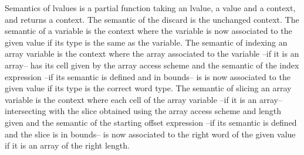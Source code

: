 \documentclass{article}
\begin{document}
\smallskip

Semantics of lvalues is a partial function taking an lvalue, a value
and a context, and returns a context.
The semantic of the discard is the unchanged context. The semantic of a variable
is the context where the variable is now associated to the given value if its
type is the same as the variable. The semantic of indexing an array variable is
the context where the array associated to the variable --if it is an array-- has
its cell given by the array access scheme and the semantic of the index
expression --if its semantic is defined and in bounds-- is is now associated to
the given value if its type is the correct word type. The semantic of slicing an
array variable is the context where each cell of the array variable --if it is
an array-- intersecting with the slice obtained using the array access scheme
and length given and the semantic of the starting offset expression --if its
semantic is defined and the slice is in bounds-- is now associated to the right
word of the given value if it is an array of the right length.

\medskip
\end{document}
